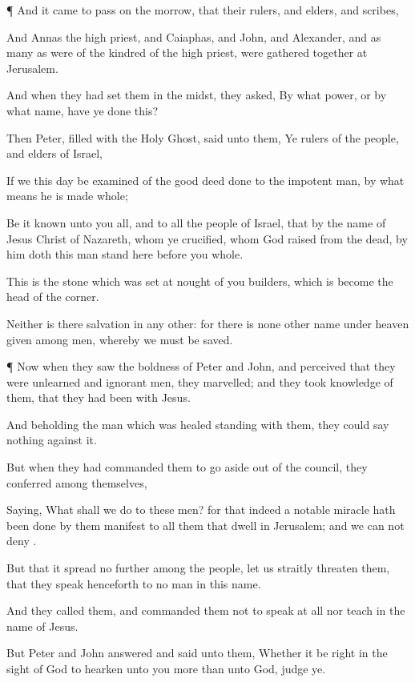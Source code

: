 {\par }{\PP {}¶
And it came to
pass
on the
morrow,
that
their
rulers,
and
elders,
and
scribes,

And
Annas the high
priest,
and
Caiaphas,
and
John,
and
Alexander,
and as many
as
were
of the
kindred of the high
priest, were gathered together
at
Jerusalem.

And
when
they had
set them
in the
midst, they
asked,
By
what
power,
or
by
what
name,
have
ye
done
this?

Then
Peter,
filled with
the
Holy
Ghost,
said
unto
them, Ye
rulers of the
people,
and
elders of
Israel,

If
we this
day be
examined
of the good deed
done
to the
impotent
man,
by what
means
he is made
whole;

Be
it
known unto
you
all,
and to
all the
people of
Israel,
that
by the
name of
Jesus
Christ of
Nazareth,
whom
ye
crucified,
whom
God
raised
from the
dead,
{}
by him
doth
this
man stand
here
before
you
whole.

This
is the
stone
which was set at
nought
of
you
builders,
which is
become the
head of the
corner.

Neither is
there
salvation
in any
other:
for there
is
none
other
name
under
heaven
given
among
men,
whereby
we
must be
saved.


\par }{\PP {}¶
Now when they
saw the
boldness of
Peter
and
John,
and
perceived
that they
were
unlearned
and
ignorant
men, they
marvelled;
and they took
knowledge of
them,
that they had
been
with
Jesus.

And
beholding the
man
which was
healed
standing
with
them, they
could
say
nothing against
it.

But when they had
commanded
them to go
aside out
of the
council, they
conferred
among
themselves,

Saying,
What shall we
do
to
these
men?
for
that
indeed a
notable
miracle hath been
done
by
them
{}
manifest to
all
them
that
dwell in
Jerusalem;
and we
can
not
deny
{}.

But
that it
spread
no
further
among the
people, let
us
straitly
threaten
them, that they
speak
henceforth to
no
man
in
this
name.

And they
called
them,
and
commanded
them
not to
speak at
all
nor
teach
in the
name of
Jesus.

But
Peter
and
John
answered and
said
unto
them,
Whether it
be
right in the sight
of
God to
hearken unto
you
more
than unto
God, judge
ye.

}
